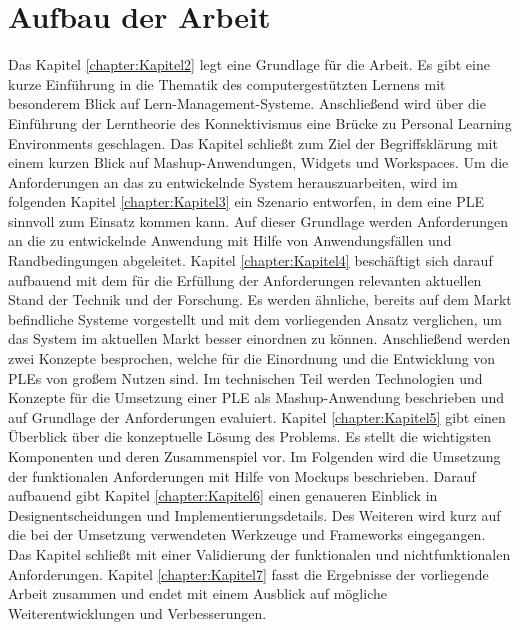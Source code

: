 \section{Aufbau der Arbeit}
Das Kapitel \ref{chapter:Kapitel2} legt eine Grundlage für die Arbeit. Es gibt eine kurze Einführung in die Thematik des computergestützten Lernens mit besonderem Blick auf Lern-Management-Systeme. Anschließend wird über die Einführung der Lerntheorie des Konnektivismus eine Brücke zu Personal Learning Environments geschlagen. Das Kapitel schließt zum Ziel der Begriffsklärung mit einem kurzen Blick auf Mashup-Anwendungen, Widgets und Workspaces. Um die Anforderungen an das zu entwickelnde System herauszuarbeiten, wird im folgenden Kapitel \ref{chapter:Kapitel3} ein Szenario entworfen, in dem eine \ac{PLE} sinnvoll zum Einsatz kommen kann. Auf dieser Grundlage werden Anforderungen an die zu entwickelnde Anwendung mit Hilfe von Anwendungsfällen und Randbedingungen abgeleitet. Kapitel \ref{chapter:Kapitel4} beschäftigt sich darauf aufbauend mit dem für die Erfüllung der Anforderungen relevanten aktuellen Stand der Technik und der Forschung. Es werden ähnliche, bereits auf dem Markt befindliche Systeme vorgestellt und mit dem vorliegenden Ansatz verglichen, um das System im aktuellen Markt besser einordnen zu können. Anschließend werden zwei Konzepte besprochen, welche für die Einordnung und die Entwicklung von \acp{PLE} von großem Nutzen sind. Im technischen Teil werden Technologien und Konzepte für die Umsetzung einer \ac{PLE} als Mashup-Anwendung beschrieben und auf Grundlage der Anforderungen evaluiert. Kapitel \ref{chapter:Kapitel5} gibt einen Überblick über die konzeptuelle Lösung des Problems. Es stellt die wichtigsten Komponenten und deren Zusammenspiel vor. Im Folgenden wird die Umsetzung der funktionalen Anforderungen mit Hilfe von Mockups beschrieben. Darauf aufbauend gibt Kapitel \ref{chapter:Kapitel6} einen genaueren Einblick in Designentscheidungen und Implementierungsdetails. Des Weiteren wird kurz auf die bei der Umsetzung verwendeten Werkzeuge und Frameworks eingegangen. Das Kapitel schließt mit einer Validierung der funktionalen und nichtfunktionalen Anforderungen. Kapitel \ref{chapter:Kapitel7} fasst die Ergebnisse der vorliegende Arbeit zusammen und endet mit einem Ausblick auf mögliche Weiterentwicklungen und Verbesserungen.


